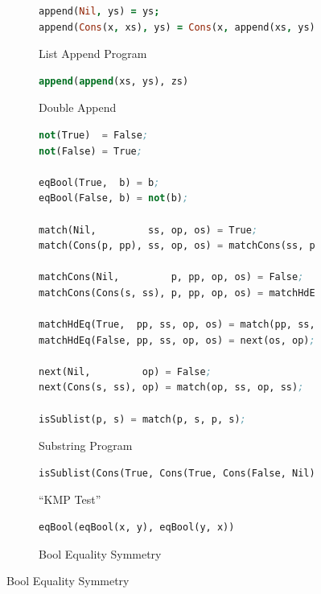 \documentclass[submission,copyright,creativecommons]{eptcs}
\begin{document}
\begin{figure}
\begin{subfigure}[b]{\linewidth}
\begin{lstlisting}[language=Prolog]
append(Nil, ys) = ys;
append(Cons(x, xs), ys) = Cons(x, append(xs, ys));
\end{lstlisting}
\caption{List Append Program}
\label{sfig:AppPrg}
\end{subfigure}

\begin{subfigure}[b]{\linewidth}
\begin{lstlisting}[language=Lisp,keywords={}]
append(append(xs, ys), zs)
\end{lstlisting}
\caption{Double Append}
\label{sfig:DoubleApp}
\end{subfigure}

\begin{subfigure}[b]{\linewidth}
\begin{lstlisting}[language=Lisp,keywords={}]
not(True)  = False;
not(False) = True;

eqBool(True,  b) = b;
eqBool(False, b) = not(b);

match(Nil,         ss, op, os) = True;
match(Cons(p, pp), ss, op, os) = matchCons(ss, p, pp, op, os);

matchCons(Nil,         p, pp, op, os) = False;
matchCons(Cons(s, ss), p, pp, op, os) = matchHdEq(eqBool(p, s), pp, ss, op, os);

matchHdEq(True,  pp, ss, op, os) = match(pp, ss, op, os);
matchHdEq(False, pp, ss, op, os) = next(os, op);

next(Nil,         op) = False;
next(Cons(s, ss), op) = match(op, ss, op, ss);

isSublist(p, s) = match(p, s, p, s);
\end{lstlisting}
\caption{Substring Program}
\label{sfig:SubstrPrg}
\end{subfigure}

\begin{subfigure}[b]{\linewidth}
\begin{lstlisting}[language=Lisp,keywords={}]
isSublist(Cons(True, Cons(True, Cons(False, Nil))), s)
\end{lstlisting}
\caption{``KMP Test''}
\label{sfig:KMP}
\end{subfigure}

\begin{subfigure}[b]{\linewidth}
\begin{lstlisting}[language=Lisp,keywords={}]
eqBool(eqBool(x, y), eqBool(y, x))
\end{lstlisting}
\caption{Bool Equality Symmetry}
\label{sfig:BoolEqSym}
\end{subfigure}


\end{figure}
\end{document}
